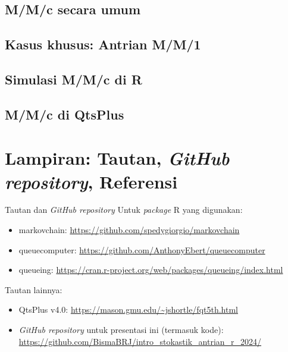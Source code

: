 \documentclass{beamer}
\begin{document}
\subsection{M/M/c secara umum}

\subsection{Kasus khusus: Antrian M/M/1}

\subsection{Simulasi M/M/c di R}

\subsection{M/M/c di QtsPlus}

\section{Lampiran: Tautan, \textit{GitHub repository}, Referensi}

\begin{frame}{Tautan dan \textit{GitHub repository}}
    Untuk \textit{package} R yang digunakan:
    \begin{itemize}
        \item markovchain: \url{https://github.com/spedygiorgio/markovchain}

        \item queuecomputer: \url{https://github.com/AnthonyEbert/queuecomputer}
        
        \item queueing: \url{https://cran.r-project.org/web/packages/queueing/index.html}
    \end{itemize}

    Tautan lainnya:

    \begin{itemize}
        \item QtsPlus v4.0: \url{https://mason.gmu.edu/~jshortle/fqt5th.html}
        
        \item \textit{GitHub repository} untuk presentasi ini (termasuk kode): \url{https://github.com/BismaBRJ/intro_stokastik_antrian_r_2024/}
    \end{itemize}
\end{frame}
\end{document}
